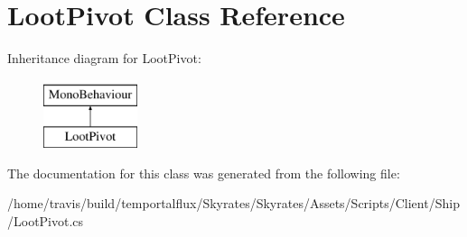 \hypertarget{class_loot_pivot}{\section{Loot\-Pivot Class Reference}
\label{class_loot_pivot}
}
Inheritance diagram for Loot\-Pivot\-:\begin{figure}[H]
\begin{center}
\leavevmode
\includegraphics[height=2.000000cm]{class_loot_pivot}
\end{center}
\end{figure}


The documentation for this class was generated from the following file\-:\begin{DoxyCompactItemize}
\item 
/home/travis/build/temportalflux/\-Skyrates/\-Skyrates/\-Assets/\-Scripts/\-Client/\-Ship/Loot\-Pivot.\-cs\end{DoxyCompactItemize}
